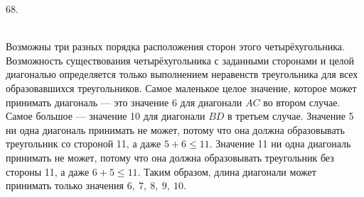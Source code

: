 68. \begin{figure}[ht!]
\end{figure}\\
Возможны три разных порядка расположения сторон этого четырёхугольника. Возможность существования четырёхугольника с заданными сторонами и целой диагональю определяется только выполнением неравенств треугольника для всех образовавшихся треугольников. Самое маленькое целое значение, которое может принимать диагональ --- это значение 6 для диагонали $AC$ во втором случае. Самое большое --- значение 10 для диагонали $BD$ в третьем случае. Значение 5 ни одна диагональ принимать не может, потому что она должна образовывать треугольник со стороной 11, а даже $5+6\leqslant11.$ Значение 11 ни одна диагональ принимать не может, потому что она должна образовывать треугольник без стороны 11, а даже $6+5\leqslant11.$ Таким образом, длина диагонали может принимать только значения $6,\ 7,\ 8,\ 9,\ 10.$\\
